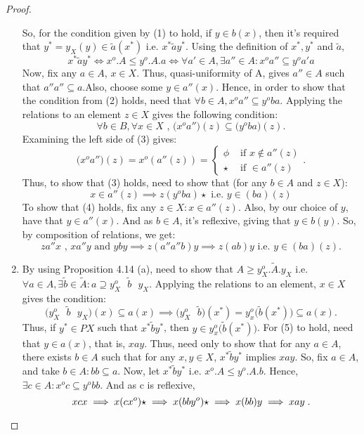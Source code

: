 \documentclass[a4paper]{article}
\theoremstyle{definition}
\begin{document}
\begin{proof}
\begin{enumerate}[label=(\alph*)]
		So, for the condition given by (1) to hold, if $y \in b(x)$, then it's required that
		$y^*=y_X(y) \in \tilde{a} (x^*)$ i.e. $x^* \tilde{a}y^*$. Using the definition of $x^*,y^*$
		and $\tilde{a}$,
		\begin{equation} x^* \tilde{a}y^* \iff x^o.A\leq y^o.A.a \iff
		\forall a' \in A, \exists a'' \in A: x^oa'' \subseteq y^oa'a  \end{equation}
		Now, fix any $a \in A$, $x\in X$. Thus, quasi-uniformity of A, gives $a'' \in A$ such that
		$a''a''\subseteq a$.Also, choose some $y \in a''(x)$. Hence, in
		order to show that the condition from (2) holds, need that
		$\forall b \in A, x^o a'' \subseteq y^oba$. Applying the relations to an element $z \in X$
		gives the following condition:
		\begin{equation} \forall b \in B, \forall x \in X \text{ , }
		\big(x^oa''\big)(z) \subseteq \big(y^oba\big)(z). \end{equation}
		Examining the left side of (3) gives:
		\[ \big( x^oa''\big)(z)=x^o (a''(z))= \begin{cases}
			\phi &\text{ if } x \notin a''(z) \\
			\star & \text{ if } \in a''(z)
		\end{cases} .\]
		Thus, to show that (3) holds, need to show that (for any $b\in A$ and $z \in X$):
		\begin{equation} x \in a''(z) \implies z(y^oba)\star \text{ i.e. } y\in(ba)(z)
		\end{equation}
		To show that (4) holds, fix any $z\in X: x \in a''(z)$. Also, by our choice of $y$,
		have that $y \in a''(x)$. And as $b\in A$, it's reflexive, giving that $y \in b(y)$.
		So, by composition of relations, we get:
		\[ za''x \text{ , }  xa''y \text{ and } yby \implies z(a''a''b)y \implies z(ab)y \text{ i.e. }
		y \in (ba)(z).\]
	\item By using Proposition 4.14 (a), need to show that $A\geq y_X^o.\tilde{A}.y_X$ i.e. $\forall
		a\in A, \exists \tilde{b}\in \tilde{A} :  a \supseteq y_X^o \text{ } \tilde{b} \text{ } y_X $.
		Applying the relations to an element, $x\in X$ gives the condition:
		\begin{equation}
			\Big( y_X^o \text{ } \tilde{b} \text{ } y_X \Big)(x) \subseteq a(x)
			\implies \Big( y_X^o \text{ } \tilde{b} \Big) (x^*)= y_x^o
			\Big(\tilde{b}(x^*)\Big) \subseteq a(x).
		\end{equation}
		Thus, if $y^* \in PX$ such that $x^* \tilde{b} y^*$, then
		$y \in y_x^o\Big(\tilde{b}(x^*)\Big)$. For (5) to hold, need that
		$y \in a(x)$, that is, $xay$. Thus,
		need only to show that for any $a\in A$, there exists $b\in A $ such that
		for any $x,y \in X$, $x^* \tilde{b}y^*$ implies $xay$.
		So, fix $a\in A$, and take $b \in A: bb \subseteq a$.
		Now, let $x^* \tilde{b}y^*$ i.e. $x^o.A \leq y^o .A .b$.
		Hence, $\exists c \in A: x^oc \subseteq y^o bb$. And as c is reflexive,
		\[ xcx \implies x(cx^o)\star \implies x(bby^o)\star \implies x(bb)y \implies xay\;. \qedhere \]
\end{enumerate}
\end{proof}
\end{document}
